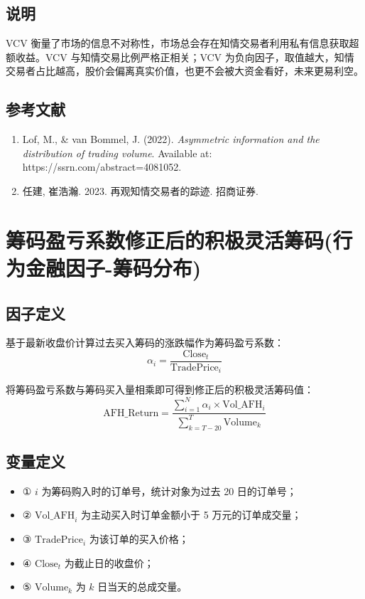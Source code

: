 \documentclass{article}
\begin{document}
\subsection{说明}
VCV 衡量了市场的信息不对称性，市场总会存在知情交易者利用私有信息获取超额收益。VCV 与知情交易比例严格正相关；VCV 为负向因子，取值越大，知情交易者占比越高，股价会偏离真实价值，也更不会被大资金看好，未来更易利空。

\subsection{参考文献}
\begin{enumerate}
    \item Lof, M., \& van Bommel, J. (2022). \textit{Asymmetric information and the distribution of trading volume}. Available at: https://ssrn.com/abstract=4081052.
    \item 任建, 崔浩瀚. 2023. 再观知情交易者的踪迹. 招商证券.
\end{enumerate}

\section{筹码盈亏系数修正后的积极灵活筹码(行为金融因子-筹码分布)}

\subsection{因子定义}
基于最新收盘价计算过去买入筹码的涨跌幅作为筹码盈亏系数：
\begin{equation}
    \alpha_i = \frac{\mathrm{Close}_t}{\mathrm{TradePrice}_i}
\end{equation}

将筹码盈亏系数与筹码买入量相乘即可得到修正后的积极灵活筹码值：
\begin{equation}
    \mathrm{AFH\_Return} = \frac{\sum_{i=1}^{N} \alpha_i \times \mathrm{Vol\_AFH}_i}{\sum_{k=T-20}^{T} \mathrm{Volume}_k}
\end{equation}

\subsection{变量定义}
\begin{itemize}
    \item ① \( i \) 为筹码购入时的订单号，统计对象为过去 20 日的订单号；
    \item ② \( \mathrm{Vol\_AFH}_i \) 为主动买入时订单金额小于 5 万元的订单成交量；
    \item ③ \( \mathrm{TradePrice}_i \) 为该订单的买入价格；
    \item ④ \( \mathrm{Close}_t \) 为截止日的收盘价；
    \item ⑤ \( \mathrm{Volume}_k \) 为 \( k \) 日当天的总成交量。
\end{itemize}
\end{document}
